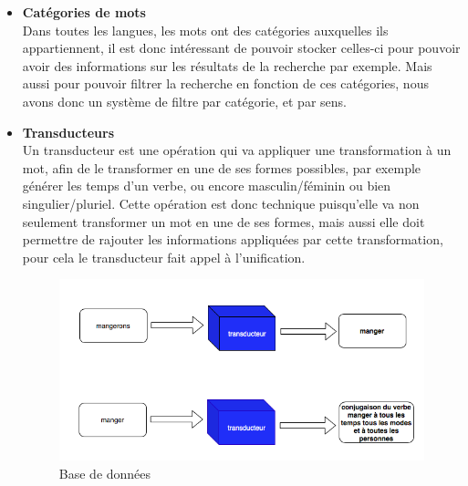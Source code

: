 \documentclass[a4paper, 12pt]{article}
\begin{document}
\begin{itemize}
    \item \textbf{Catégories de mots} \\
        Dans toutes les langues, les mots ont des catégories auxquelles ils appartiennent, il est donc intéressant de pouvoir stocker celles-ci pour pouvoir avoir des informations sur les résultats de la recherche par exemple. Mais aussi pour pouvoir filtrer la recherche en fonction de ces catégories, nous avons donc un système de filtre par catégorie, et par sens.
\item \textbf{Transducteurs} \\
        Un transducteur est une opération qui va appliquer une transformation à un mot, afin de le transformer en une de ses formes possibles, par exemple générer les temps d'un verbe, ou encore masculin/féminin ou bien singulier/pluriel. Cette opération est donc technique puisqu'elle va non seulement transformer un mot en une de ses formes, mais aussi elle doit permettre de rajouter les informations appliquées par cette transformation, pour cela le transducteur fait appel à l'unification.
\begin{figure}[H]
    \centerline{\includegraphics[scale=0.7]{transducteur.png}}
    \caption{Base de données}
\end{figure}


\end{itemize}
\end{document}
